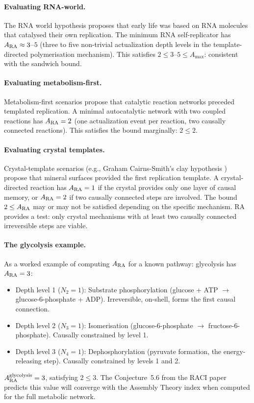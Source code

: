 \documentclass[12pt,a4paper]{article}
\begin{document}
\paragraph{Evaluating RNA-world.}  The RNA world hypothesis proposes that early life was based on RNA molecules that catalysed their own replication.  The minimum RNA self-replicator has $A_{\rm RA}\approx3$--$5$ (three to five non-trivial actualization depth levels in the template-directed polymerisation mechanism).  This satisfies $2\leq3$--$5\leq A_{\max}$: consistent with the sandwich bound.

\paragraph{Evaluating metabolism-first.}  Metabolism-first scenarios propose that catalytic reaction networks preceded templated replication.  A minimal autocatalytic network with two coupled reactions has $A_{\rm RA}=2$ (one actualization event per reaction, two causally connected reactions).  This satisfies the bound marginally: $2\leq2$.

\paragraph{Evaluating crystal templates.}  Crystal-template scenarios (e.g., Graham Cairns-Smith's clay hypothesis \cite{CairnsSmith1982}) propose that mineral surfaces provided the first replication template.  A crystal-directed reaction has $A_{\rm RA}=1$ if the crystal provides only one layer of causal memory, or $A_{\rm RA}=2$ if two causally connected steps are involved.  The bound $2\leq A_{\rm RA}$ may or may not be satisfied depending on the specific mechanism.  RA provides a test: only crystal mechanisms with at least two causally connected irreversible steps are viable.

\paragraph{The glycolysis example.}  As a worked example of computing $A_{\rm RA}$ for a known pathway: glycolysis has $A_{\rm RA}=3$:
\begin{itemize}
  \item Depth level 1 ($N_2=1$): Substrate phosphorylation (glucose + ATP $\to$ glucose-6-phosphate + ADP).  Irreversible, on-shell, forms the first causal connection.
  \item Depth level 2 ($N_3=1$): Isomerisation (glucose-6-phosphate $\to$ fructose-6-phosphate).  Causally constrained by level 1.
  \item Depth level 3 ($N_4=1$): Dephosphorylation (pyruvate formation, the energy-releasing step).  Causally constrained by levels 1 and 2.
\end{itemize}
$A_{\rm RA}^{\rm glycolysis}=3$, satisfying $2\leq3$.  The Conjecture~5.6 from the RACI paper predicts this value will converge with the Assembly Theory index when computed for the full metabolic network.
\end{document}
